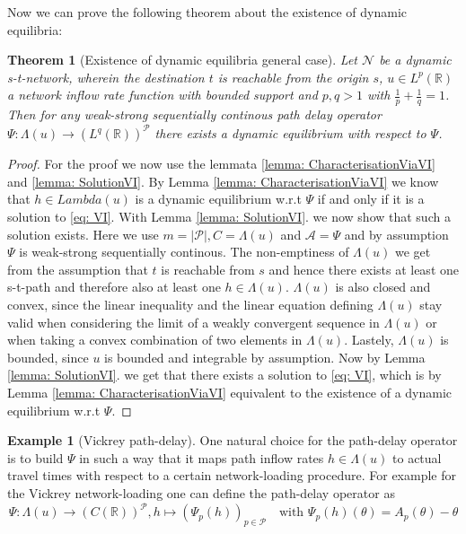 \documentclass[reqno,openany]{amsbook}
\theoremstyle{definition}
\newtheorem{example}[definition]{Example}
\theoremstyle{plain}
\newtheorem{theorem}[definition]{Theorem}
\begin{document}
Now we can prove the following theorem about the existence of dynamic equilibria:

\begin{theorem}[Existence of dynamic equilibria general case]\label{thm: ExistenceGeneral}
Let $\mathcal{N}$ be a dynamic s-t-network, wherein the destination $t$ is reachable from the origin $s$, $u \in L^p(\mathbb{R})$ a network inflow rate function with bounded support and $p, q > 1$ with $\frac{1}{p} + \frac{1}{q} = 1$. Then for any weak-strong sequentially continous path delay operator $\Psi: \Lambda(u) \to (L^q(\mathbb{R}))^{\mathcal{P}}$ there exists a dynamic equilibrium with respect to $\Psi$.
\end{theorem}

\begin{proof}
For the proof we now use the lemmata \ref{lemma: CharacterisationViaVI} and \ref{lemma: SolutionVI}. By Lemma \ref{lemma: CharacterisationViaVI}  we know that $h \in Lambda(u)$ is a dynamic equilibrium w.r.t $\Psi$ if and only if it is a solution to \eqref{eq: VI}. With Lemma \ref{lemma: SolutionVI}. we now show that such a solution exists. Here we use $m = \lvert \mathcal{P} \rvert, C = \Lambda(u)$ and $\mathcal{A} = \Psi$ and by assumption $\Psi$ is weak-strong sequentially continous. The non-emptiness of $\Lambda(u)$ we get from the assumption that $t$ is reachable from $s$ and hence there exists at least one s-t-path and therefore also at least one $h \in \Lambda(u)$. $\Lambda(u)$ is also closed and convex, since the linear inequality and the linear equation defining $\Lambda(u)$ stay valid when considering the limit of a weakly convergent sequence in $\Lambda(u)$ or when taking a convex combination of two elements in $\Lambda(u)$. Lastely, $\Lambda(u)$ is bounded, since $u$ is bounded and integrable by assumption. Now by Lemma \ref{lemma: SolutionVI}. we get that there exists a solution to \eqref{eq: VI}, which is by Lemma \ref{lemma: CharacterisationViaVI} equivalent to the existence of a dynamic equilibrium w.r.t $\Psi$.
\end{proof}

\begin{example}[Vickrey path-delay]\label{exp: VickreyPathDelay}
One natural choice for the path-delay operator is to build $\Psi$ in such a way that it maps path inflow rates $h \in \Lambda(u)$ to actual travel times with respect to a certain network-loading procedure. For example for the Vickrey network-loading one can define the path-delay operator as 
\[ \Psi: \Lambda(u) \to (C(\mathbb{R}))^{\mathcal{P}}, h \mapsto (\Psi_p(h))_{p \in \mathcal{P}} \quad \text{with $\Psi_p(h)(\theta) = A_p(\theta) - \theta$} \]
\end{example}
\end{document}
